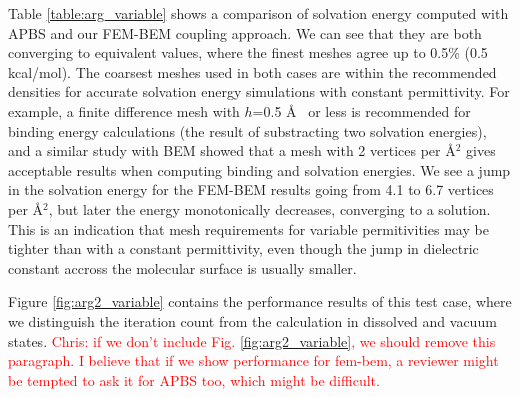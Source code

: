 Table \ref{table:arg_variable} shows a comparison of solvation energy computed with APBS and our FEM-BEM coupling approach. We can see that they are both converging to equivalent values, where the finest meshes agree up to 0.5\% (0.5 kcal/mol). The coarsest meshes used in both cases are within the recommended densities for accurate solvation energy simulations with constant permittivity. For example, a finite difference mesh with $h$=0.5 \AA~ or less is recommended for binding energy calculations\cite{sorensen2015comprehensive} (the result of substracting two solvation energies), and a similar study with BEM\cite{CooperBardhanBarba2014} showed that a mesh with 2 vertices per \AA$^2$ gives acceptable results when computing binding and solvation energies. We see a jump in the solvation energy for the FEM-BEM results going from 4.1 to 6.7 vertices per \AA$^2$, but later the energy monotonically decreases, converging to a solution. This is an indication that mesh requirements for variable permitivities may be tighter than with a constant permittivity, even though the jump in dielectric constant accross the molecular surface is usually smaller. 

Figure \ref{fig:arg2_variable} contains the performance results of this test case, where we distinguish the iteration count from the calculation in dissolved and vacuum states. \textcolor{red}{Chris: if we don't include Fig. \ref{fig:arg2_variable}, we should remove this paragraph. I believe that if we show performance for fem-bem, a reviewer might be tempted to ask it for APBS too, which might be difficult.}

